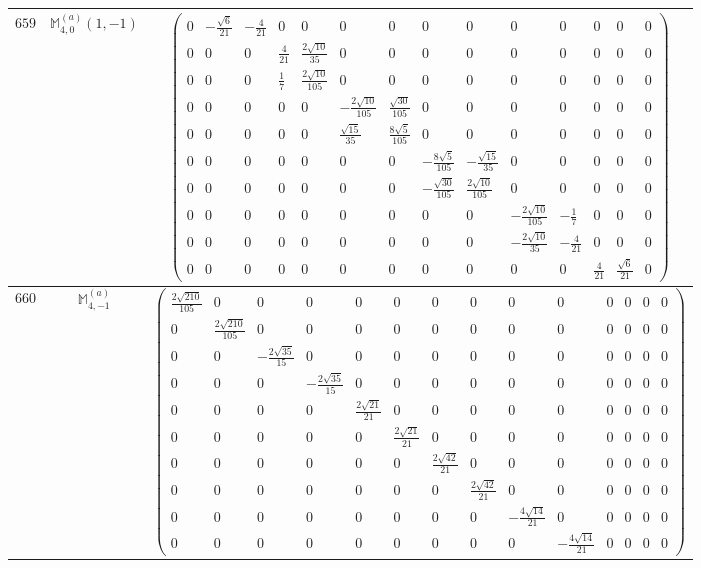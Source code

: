 \documentclass[fleqn,8pt,landscape]{jsarticle}
\begin{document}
\begin{center}
\begin{longtable}{ccc}
$ 659 $ & $ \mathbb{M}_{4,0}^{(a)}(1,-1) $ & $ \begin{pmatrix} 0 & - \frac{\sqrt{6}}{21} & - \frac{4}{21} & 0 & 0 & 0 & 0 & 0 & 0 & 0 & 0 & 0 & 0 & 0 \\ 0 & 0 & 0 & \frac{4}{21} & \frac{2 \sqrt{10}}{35} & 0 & 0 & 0 & 0 & 0 & 0 & 0 & 0 & 0 \\ 0 & 0 & 0 & \frac{1}{7} & \frac{2 \sqrt{10}}{105} & 0 & 0 & 0 & 0 & 0 & 0 & 0 & 0 & 0 \\ 0 & 0 & 0 & 0 & 0 & - \frac{2 \sqrt{10}}{105} & \frac{\sqrt{30}}{105} & 0 & 0 & 0 & 0 & 0 & 0 & 0 \\ 0 & 0 & 0 & 0 & 0 & \frac{\sqrt{15}}{35} & \frac{8 \sqrt{5}}{105} & 0 & 0 & 0 & 0 & 0 & 0 & 0 \\ 0 & 0 & 0 & 0 & 0 & 0 & 0 & - \frac{8 \sqrt{5}}{105} & - \frac{\sqrt{15}}{35} & 0 & 0 & 0 & 0 & 0 \\ 0 & 0 & 0 & 0 & 0 & 0 & 0 & - \frac{\sqrt{30}}{105} & \frac{2 \sqrt{10}}{105} & 0 & 0 & 0 & 0 & 0 \\ 0 & 0 & 0 & 0 & 0 & 0 & 0 & 0 & 0 & - \frac{2 \sqrt{10}}{105} & - \frac{1}{7} & 0 & 0 & 0 \\ 0 & 0 & 0 & 0 & 0 & 0 & 0 & 0 & 0 & - \frac{2 \sqrt{10}}{35} & - \frac{4}{21} & 0 & 0 & 0 \\ 0 & 0 & 0 & 0 & 0 & 0 & 0 & 0 & 0 & 0 & 0 & \frac{4}{21} & \frac{\sqrt{6}}{21} & 0 \end{pmatrix} $ \\ \hline
$ 660 $ & $ \mathbb{M}_{4,-1}^{(a)} $ & $ \begin{pmatrix} \frac{2 \sqrt{210}}{105} & 0 & 0 & 0 & 0 & 0 & 0 & 0 & 0 & 0 & 0 & 0 & 0 & 0 \\ 0 & \frac{2 \sqrt{210}}{105} & 0 & 0 & 0 & 0 & 0 & 0 & 0 & 0 & 0 & 0 & 0 & 0 \\ 0 & 0 & - \frac{2 \sqrt{35}}{15} & 0 & 0 & 0 & 0 & 0 & 0 & 0 & 0 & 0 & 0 & 0 \\ 0 & 0 & 0 & - \frac{2 \sqrt{35}}{15} & 0 & 0 & 0 & 0 & 0 & 0 & 0 & 0 & 0 & 0 \\ 0 & 0 & 0 & 0 & \frac{2 \sqrt{21}}{21} & 0 & 0 & 0 & 0 & 0 & 0 & 0 & 0 & 0 \\ 0 & 0 & 0 & 0 & 0 & \frac{2 \sqrt{21}}{21} & 0 & 0 & 0 & 0 & 0 & 0 & 0 & 0 \\ 0 & 0 & 0 & 0 & 0 & 0 & \frac{2 \sqrt{42}}{21} & 0 & 0 & 0 & 0 & 0 & 0 & 0 \\ 0 & 0 & 0 & 0 & 0 & 0 & 0 & \frac{2 \sqrt{42}}{21} & 0 & 0 & 0 & 0 & 0 & 0 \\ 0 & 0 & 0 & 0 & 0 & 0 & 0 & 0 & - \frac{4 \sqrt{14}}{21} & 0 & 0 & 0 & 0 & 0 \\ 0 & 0 & 0 & 0 & 0 & 0 & 0 & 0 & 0 & - \frac{4 \sqrt{14}}{21} & 0 & 0 & 0 & 0 \end{pmatrix} $ \\ \hline

\end{longtable}
\end{center}
\end{document}
